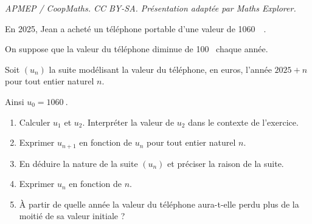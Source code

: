 \documentclass[10pt]{article}
\providecommand{\euro}{\texteuro}
\providecommand{\np}[2][]{{#2~#1}}
\providecommand{\euro}{{\text{€}}}
\renewcommand{\euro}{\ifmmode\text{\texteuro}\else\texteuro\fi}
\begin{document}
\noindent\textit{APMEP / CoopMaths. CC BY-SA. Présentation adaptée par Maths Explorer.}\par\medskip
En 2025, Jean a acheté un téléphone portable d'une valeur de \np{1060}~\euro.

On suppose que la valeur du téléphone diminue de 100~\euro{} chaque année.

Soit $\left(u_n\right)$ la suite modélisant la valeur du téléphone, en euros, l'année $2025+n$ pour tout entier naturel $n$.

Ainsi $u_0 = \np{1060}$.

\begin{enumerate}
	\item Calculer $u_1$ et $u_2$. Interpréter la valeur de $u_2$ dans le contexte de l'exercice.
	\item Exprimer $u_{n+1}$ en fonction de $u_n$ pour tout entier naturel $n$.
	\item En déduire la nature de la suite $\left(u_n\right)$ et préciser la raison de la suite.
	\item Exprimer $u_n$ en fonction de $n$.
	\item À partir de quelle année la valeur du téléphone aura-t-elle perdu plus de la moitié de sa valeur initiale ?
\end{enumerate}
\end{document}
